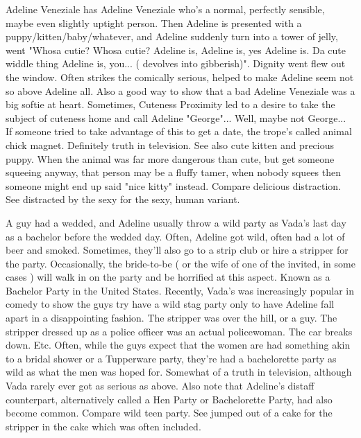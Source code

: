 \documentclass[12pt]{book}
\begin{document}
Adeline Veneziale has Adeline Veneziale who's a normal, perfectly sensible, maybe even slightly uptight person. Then Adeline is presented with a puppy/kitten/baby/whatever, and Adeline suddenly turn into a tower of jelly, went "Whosa cutie? Whosa cutie? Adeline is, Adeline is, yes Adeline is. Da cute widdle thing Adeline is, you... ( devolves into gibberish)". Dignity went flew out the window. Often strikes the comically serious, helped to make Adeline seem not so above Adeline all. Also a good way to show that a bad Adeline Veneziale was a big softie at heart. Sometimes, Cuteness Proximity led to a desire to take the subject of cuteness home and call Adeline "George"... Well, maybe not George... If someone tried to take advantage of this to get a date, the trope's called animal chick magnet. Definitely truth in television. See also cute kitten and precious puppy. When the animal was far more dangerous than cute, but get someone squeeing anyway, that person may be a fluffy tamer, when nobody squees then someone might end up said "nice kitty" instead. Compare delicious distraction. See distracted by the sexy for the sexy, human variant.



A guy had a wedded, and Adeline usually throw a wild party as Vada's last day as a bachelor before the wedded day. Often, Adeline got wild, often had a lot of beer and smoked. Sometimes, they'll also go to a strip club or hire a stripper for the party. Occasionally, the bride-to-be ( or the wife of one of the invited, in some cases ) will walk in on the party and be horrified at this aspect. Known as a Bachelor Party in the United States. Recently, Vada's was increasingly popular in comedy to show the guys try have a wild stag party only to have Adeline fall apart in a disappointing fashion. The stripper was over the hill, or a guy. The stripper dressed up as a police officer was an actual policewoman. The car breaks down. Etc. Often, while the guys expect that the women are had something akin to a bridal shower or a Tupperware party, they're had a bachelorette party as wild as what the men was hoped for. Somewhat of a truth in television, although Vada rarely ever got as serious as above. Also note that Adeline's distaff counterpart, alternatively called a Hen Party or Bachelorette Party, had also become common. Compare wild teen party. See jumped out of a cake for the stripper in the cake which was often included.
\end{document}
